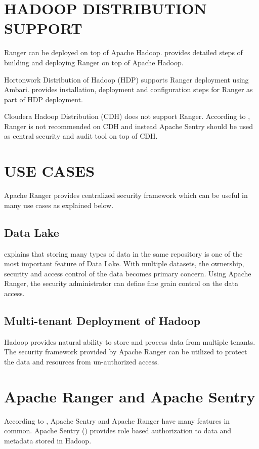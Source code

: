 \documentclass[9pt,twocolumn,twoside]{styles/osajnl}
\begin{document}
\section{HADOOP DISTRIBUTION SUPPORT}
Ranger can be deployed on top of Apache Hadoop.
\cite{www-ranger-on-apache-hadoop} provides detailed steps of building and
deploying Ranger on top of Apache Hadoop.

Hortonwork Distribution of Hadoop (HDP) supports Ranger deployment using
Ambari. \cite{www-ranger-on-hdp} provides installation, deployment and
configuration steps for Ranger as part of HDP deployment.

Cloudera Hadoop Distribution (CDH) does not support Ranger. According to
\cite{www-ranger-on-cdh}, Ranger is not recommended on CDH and instead Apache
Sentry should be used as central security and audit tool on top of CDH.

\section{USE CASES}
Apache Ranger provides centralized security framework which can be useful in
many use cases as explained below.

\subsection{Data Lake}
\cite{data-lake-whitepaper} explains that storing many types of data in the
same repository is one of the most important feature of Data Lake. With
multiple datasets, the ownership, security and access control of the data
becomes primary concern. Using Apache Ranger, the security administrator can
define fine grain control on the data access.

\subsection{Multi-tenant Deployment of Hadoop}
Hadoop provides natural ability to store and process data from multiple
tenants. The security framework provided by Apache Ranger can be utilized to
protect the data and resources from un-authorized access.

\section{Apache Ranger and Apache Sentry}
According to \cite{www-5security-blog}, Apache Sentry and Apache Ranger have
many features in common. Apache Sentry (\cite{www-apache-sentry}) provides
role based authorization to data and metadata stored in Hadoop.
\end{document}
